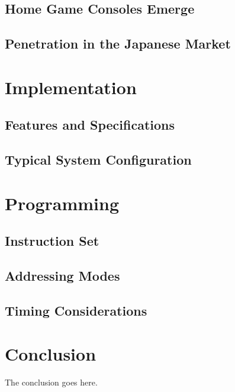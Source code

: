 \documentclass[journal]{IEEEtran}
\begin{document}
\subsection{Home Game Consoles Emerge}

\subsection{Penetration in the Japanese Market}

\section{Implementation}

\subsection{Features and Specifications}

\subsection{Typical System Configuration}

\section{Programming}

\subsection{Instruction Set}

\subsection{Addressing Modes}

\subsection{Timing Considerations}

\section{Conclusion}
The conclusion goes here.

\end{document}
